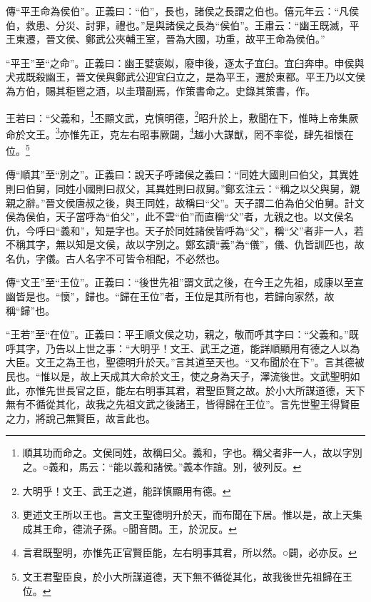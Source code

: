 {\noindent\zhuan{}\fzbyks 傳“平王命為侯伯”。正義曰：“伯”，長也，諸侯之長謂之伯也。僖元年云：“凡侯伯，救患、分災、討罪，禮也。”是與諸侯之長為“侯伯”。王肅云：“幽王既滅，平王東遷，晉文侯、鄭武公夾輔王室，晉為大國，功重，故平王命為侯伯。” \par}

{\noindent\shu{}\fzkt “平王”至“之命”。正義曰：幽王嬖褒姒，廢申後，逐太子宜臼。宜臼奔申。申侯與犬戎既殺幽王，晉文侯與鄭武公迎宜臼立之，是為平王，遷於東都。平王乃以文侯為方伯，賜其秬鬯之酒，以圭瓚副焉，作策書命之。史錄其策書，作。 \par}

王若曰：“父義和，\footnote{順其功而命之。文侯同姓，故稱曰父。義和，字也。稱父者非一人，故以字別之。○義和，馬云：“能以義和諸侯。”義本作誼。別，彼列反。}丕顯文武，克慎明德，\footnote{大明乎！文王、武王之道，能詳慎顯用有德。}昭升於上，敷聞在下，惟時上帝集厥命於文王。\footnote{更述文王所以王也。言文王聖德明升於天，而布聞在下居。惟以是，故上天集成其王命，德流子孫。○聞音問。王，於況反。}亦惟先正，克左右昭事厥闢，\footnote{言君既聖明，亦惟先正官賢臣能，左右明事其君，所以然。○闢，必亦反。}越小大謀猷，罔不率從，肆先祖懷在位。\footnote{文王君聖臣良，於小大所謀道德，天下無不循從其化，故我後世先祖歸在王位。}


{\noindent\zhuan{}\fzbyks 傳“順其”至“別之”。正義曰：說天子呼諸侯之義曰：“同姓大國則曰伯父，其異姓則曰伯舅，同姓小國則曰叔父，其異姓則曰叔舅。”鄭玄注云：“稱之以父與舅，親親之辭。”晉文侯唐叔之後，與王同姓，故稱曰“父”。天子謂二伯為伯父伯舅。計文侯為侯伯，天子當呼為“伯父”，此不雲“伯”而直稱“父”者，尢親之也。以文侯名仇，今呼曰“義和”，知是字也。天子於同姓諸侯皆呼為“父”，稱“父”者非一人，若不稱其字，無以知是文侯，故以字別之。鄭玄讀“義”為“儀”，儀、仇皆訓匹也，故名仇，字儀。古人名字不可皆令相配，不必然也。 \par}

{\noindent\zhuan{}\fzbyks 傳“文王”至“王位”。正義曰：“後世先祖”謂文武之後，在今王之先祖，成康以至宣幽皆是也。“懷”，歸也。“歸在王位”者，王位是其所有也，若歸向家然，故稱“歸”也。 \par}

{\noindent\shu{}\fzkt “王若”至“在位”。正義曰：平王順文侯之功，親之，敬而呼其字曰：“父義和。”既呼其字，乃告以上世之事：“大明乎！文王、武王之道，能詳順顯用有德之人以為大臣。文王之為王也，聖德明升於天。”言其道至天也。“又布聞於在下”。言其德被民也。“惟以是，故上天成其大命於文王，使之身為天子，澤流後世。文武聖明如此，亦惟先世長官之臣，能左右明事其君，君聖臣賢之故。於小大所謀道德，天下無有不循從其化，故我之先祖文武之後諸王，皆得歸在王位”。言先世聖王得賢臣之力，將說己無賢臣，故言此也。 \par}

